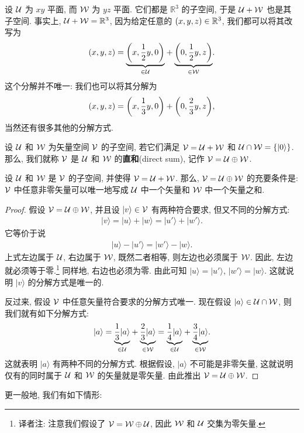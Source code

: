 \documentclass[lang=cn,zihao=-4,twoside,fontset=none]{textbook}
\makeatletter
\newcommand{\undernote}[2]{\underset{#1}{\underbrace{#2}}}
\def\eq#1{\[\begin{aligned}{}#1\end{aligned}\]}
\renewcommand{\ket}[1]{| #1 \rangle}
\newcommand{\addterm}[2]{\textbf{#1}{(#2)}\index[nidx]{#1@\textbf{#1}(#2)}}
\makeatother
\begin{document}
\begin{exam}\label{eg:2.1.11}
    设 ${\mathcal U}$ 为 $xy$ 平面, 而 ${\mathcal W}$ 为 $yz$ 平面. 它们都是 $\mathbb R^3$ 的子空间, 于是 ${\mathcal U}+{\mathcal W}$ 也是其子空间. 事实上, ${\mathcal U}+{\mathcal W} = {\mathbb R}^3$, 因为给定任意的 $(x,y,z)\in{\mathbb R}^3$, 我们都可以将其改写为 
    \eq{
        (x,y,z)=\underset{\in\mU}{\underbrace{\bigg(x,\frac{1}{2}y,0\bigg)}} + \underset{\in\mW}{\underbrace{\bigg(0,\frac{1}{2}y,z\bigg)}}.
    }
    这个分解并不唯一: 我们也可以将其分解为
    \eq{
        (x,y,z)=\qty(x,\frac{1}{3}y,0)+\qty(0,\frac{2}{3}y,z),
    }
    当然还有很多其他的分解方式.
\end{exam}

\begin{defi}
    [直和]\label{def:2.1.12}%
    设 ${\mathcal U}$ 和 ${\mathcal W}$ 为矢量空间 ${\mathcal V}$ 的子空间, 若它们满足 ${\mathcal V}={\mathcal U}+{\mathcal W}$ 和 $\mU\cap\mW=\{\ket{0}\}$. 那么, 我们就称 ${\mathcal V}$ 是 ${\mathcal U}$ 和 ${\mathcal W}$ 的\addterm{直和}{direct sum}, 记作 ${\mathcal V}={\mathcal U}\oplus{\mathcal W}$. 
\end{defi}

\begin{prop}[直和的唯一性]\label{prop:2.1.13}%
    设 ${\mathcal U}$ 和 ${\mathcal W}$ 是 ${\mathcal V}$ 的子空间, 并使得 ${\mathcal V}={\mathcal U}+{\mathcal W}$. 那么, ${\mathcal V}={\mathcal U}\oplus{\mathcal W}$ 的充要条件是: ${\mathcal V}$ 中任意非零矢量可以唯一地写成 ${\mathcal U}$ 中一个矢量和 ${\mathcal W}$ 中一个矢量之和.
\end{prop}
\begin{proof}
    假设 ${\mathcal V}={\mathcal U}\oplus{\mathcal W}$, 并且设 $\ket{v}\in\mV$ 有两种符合要求, 但又不同的分解方式:
    \eq{
        \ket{v}=\ket{u}+\ket{w}=\ket{u'}+\ket{w'}.
    }
    它等价于说
    \eq{
        \ket{u}-\ket{u'} = \ket{w'} - \ket{w}.
    }
    上式左边属于 ${\mathcal U}$, 右边属于 ${\mathcal W}$, 既然二者相等, 则左边也必须属于 ${\mathcal W}$. 因此, 左边就必须等于零.\footnote{译者注: 注意我们假设了 ${\mathcal V}={\mathcal W}\oplus{\mathcal U}$, 因此 ${\mathcal W}$ 和 ${\mathcal U}$ 交集为零矢量.} 同样地, 右边也必须为零. 由此可知 $\ket{u}=\ket{u'}$, $\ket{w'}=\ket{w}$. 这就说明 $\ket{v}$ 的分解方式是唯一的. 

    反过来, 假设 ${\mathcal V}$ 中任意矢量符合要求的分解方式唯一. 现在假设 $\ket{a}\in\mU\cap\mW$, 则我们就有如下分解方式:
    \eq{
        \ket{a}=\undernote{\in\mU}{\frac{1}{3}\ket{a}}+\undernote{\in\mW}{\frac{2}{3}\ket{a}}=\undernote{\in\mU}{\frac{1}{4}\ket{a}}+ \undernote{\in\mW}{\frac{3}{4}\ket{a}}.
    }
    这就表明 $\ket{a}$ 有两种不同的分解方式. 根据假设, $\ket{a}$ 不可能是非零矢量, 这就说明仅有的同时属于 ${\mathcal U}$ 和 ${\mathcal W}$ 的矢量就是零矢量. 由此推出 ${\mathcal V} = {\mathcal U} \oplus {\mathcal W}$. 
\end{proof}

更一般地, 我们有如下情形:
\end{document}
